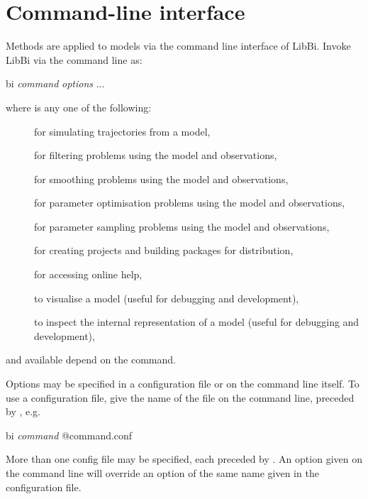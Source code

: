 \section{Command-line interface\label{Command_line_interface}}

Methods are applied to models via the command line interface of LibBi. Invoke LibBi
via the command line as:
\begin{cmdcode}
bi \textit{command} \textit{options} ...
\end{cmdcode}
where  is any one of the following:
\begin{description}
\item[] for simulating trajectories from a model,
\item[] for filtering problems using the model and
  observations,
\item[] for smoothing problems using the model and
  observations,
\item[] for parameter optimisation problems using the
  model and observations,
\item[] for parameter sampling problems using the model and
  observations,
\item[] for creating projects and building packages for
  distribution,
\item[] for accessing online help,
\item[] to visualise a model (useful for
  debugging and development),
\item[] to inspect the internal representation of a model
  (useful for debugging and development),
\end{description}
and available  depend on the command.

Options may be specified in a configuration file or on the
command line itself. To use a configuration file, give the name of the file on
the command line, preceded by , e.g.
\begin{cmdcode}
bi \textit{command} @command.conf
\end{cmdcode}

More than one config file may be specified, each preceded by . An
option given on the command line will override an option of the same name
given in the configuration file.

